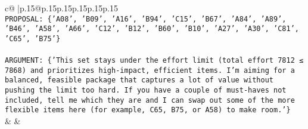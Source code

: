 \documentclass{article}
\begin{document}
{\begin{supertabular}{c@{$\;$}|p{.15\linewidth}@{}p{.15\linewidth}p{.15\linewidth}p{.15\linewidth}p{.15\linewidth}p{.15\linewidth}}
{{{\\ 
\texttt{PROPOSAL: \{'A08', 'B09', 'A16', 'B94', 'C15', 'B67', 'A84', 'A89', 'B46', 'A58', 'A66', 'C12', 'B12', 'B60', 'B10', 'A27', 'A30', 'C81', 'C65', 'B75'\}} \\
\\ 
\texttt{ARGUMENT: \{'This set stays under the effort limit (total effort 7812 ≤ 7868) and prioritizes high{-}impact, efficient items. I’m aiming for a balanced, feasible package that captures a lot of value without pushing the limit too hard. If you have a couple of must{-}haves not included, tell me which they are and I can swap out some of the more flexible items here (for example, C65, B75, or A58) to make room.'\}} \\
            }
        }
    }
    & & \\ \\


\end{supertabular}}
\end{document}
